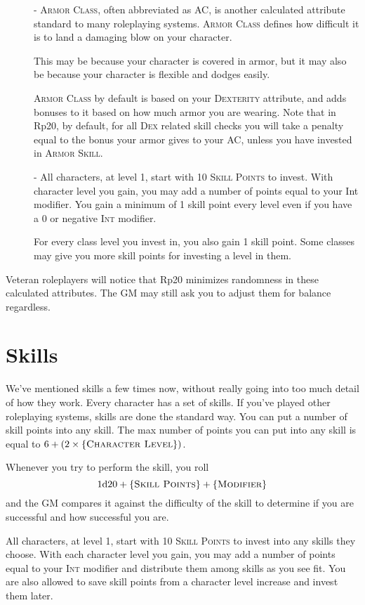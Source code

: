 \begin{description}
	\item[] - \textsc{Armor Class}, often abbreviated as AC, is another calculated attribute standard to many roleplaying systems. \textsc{Armor Class} defines how difficult it is to land a damaging blow on your character.
	
	This may be because your character is covered in armor, but it may also be because your character is flexible and dodges easily.
	
	\textsc{Armor Class} by default is based on your \textsc{Dexterity} attribute, and adds bonuses to it based on how much armor you are wearing. Note that in Rp20, by default, for all \textsc{Dex} related skill checks you will take a penalty equal to the bonus your armor gives to your AC, unless you have invested in \textsc{Armor Skill}.
	
	\item[] - All characters, at level 1, start with 10 \textsc{Skill Points} to invest. With character level you gain, you may add a number of points equal to your Int modifier. You gain a minimum of 1 skill point every level even if you have a 0 or negative \textsc{Int} modifier.
	
	For every class level you invest in, you also gain 1 skill point. Some classes may give you more skill points for investing a level in them.
\end{description}

Veteran roleplayers will notice that Rp20 minimizes randomness in these calculated attributes. The GM may still ask you to adjust them for balance regardless.

\section{Skills}
We've mentioned skills a few times now, without really going into too much detail of how they work. Every character has a set of skills. If you’ve played other roleplaying systems, skills are done the standard way. You can put a number of skill points into any skill. The max number of points you can put into any skill is equal to $6+(2\times \{ \textsc{Character Level} \})$.

Whenever you try to perform the skill, you roll $$1\mathrm{d}20 + \{ \textsc{Skill Points} \} + \{ \textsc{Modifier} \}$$ and the GM compares it against the difficulty of the skill to determine if you are successful and how successful you are.

All characters, at level 1, start with 10 \textsc{Skill Points} to invest into any skills they choose. With each character level you gain, you may add a number of points equal to your \textsc{Int} modifier and distribute them among skills as you see fit. You are also allowed to save skill points from a character level increase and invest them later.

